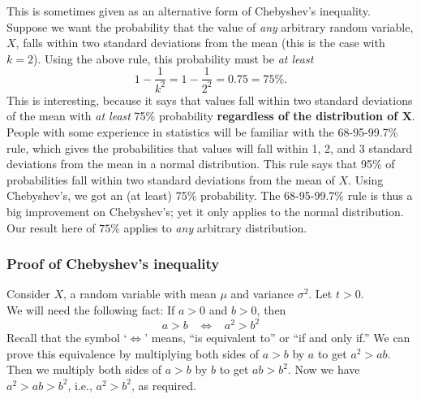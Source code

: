 \noindent This is sometimes given as an alternative form of Chebyshev's inequality. \\

\noindent Suppose we want the probability that the value of \textit{any} arbitrary random variable, $X$, falls within two standard deviations from the mean (this is the case with $k = 2$). Using the above rule, this probability must be \textit{at least}
\[
1 - \frac{1}{k^2} = 1 - \frac{1}{2^2} = 0.75 = 75\%.
\]
This is interesting, because it says that values fall within two standard deviations of the mean with \textit{at least} 75\% probability \textbf{regardless of the distribution of $\boldsymbol{X}$}. \\

\noindent People with some experience in statistics will be familiar with the 68-95-99.7\% rule, which gives the probabilities that values will fall within 1, 2, and 3 standard deviations from the mean in a normal distribution. This rule says that 95\% of probabilities fall within two standard deviations from the mean of $X$. Using Chebyshev's, we got an (at least) 75\% probability. The 68-95-99.7\% rule is thus a big improvement on Chebyshev's; yet it only applies to the normal distribution. Our result here of $75\%$ applies to \textit{any} arbitrary distribution. 


\subsubsection{Proof of Chebyshev's inequality}
Consider $X$, a random variable with mean $\mu$ and variance $\sigma^2$. Let $t > 0$. \\

\noindent We will need the following fact: If $a > 0$ and $b > 0$, then
\[
a > b \;\;\; \iff \;\;\; a^2 > b^2 
\]
Recall that the symbol `$\iff$' means, ``is equivalent to'' or ``if and only if.'' We can prove this equivalence by multiplying both sides of $a > b$ by $a$ to get $a^2 > ab$. Then we multiply both sides of $a > b$ by $b$ to get $ab > b^2$. Now we have $a^2 > ab > b^2$, i.e., $a^2 > b^2$, as required. \\

